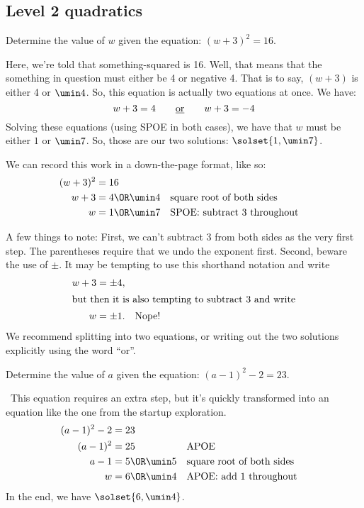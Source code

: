 \subsection{Level 2 quadratics}

\begin{boxexplore}
Determine the value of $w$ given the equation: $(w+3)^2 = 16$.
\end{boxexplore} %

Here, we're told that something-squared is 16. Well, that means that the something in question must either be 4 or negative 4. That is to say, $(w+3)$ is either 4 or $\umin4$. So, this equation is actually two equations at once. We have:
\[w+3 = 4 \qquad\text{\underline{or}}\qquad w+3 = -4\]
Solving these equations (using SPOE in both cases), we have that $w$ must be either $1$ or $\umin7$. So, those are our two solutions: $\solset{1,\umin7}$.

We can record this work in a down-the-page format, like so:
\begin{align*}
(w+3)^2 &= 16
\\
w+3 &= 4 \OR \umin4
&&\text{square root of both sides}
\\
w &= 1 \OR \umin7
&&\text{SPOE: subtract 3 throughout}
\end{align*}

A few things to note: First, we can't subtract 3 from both sides as the very first step. The parentheses require that we undo the exponent first. Second, beware the use of $\pm$. It may be tempting to use this shorthand notation and write
\begin{align*}
w+3 &= \pm4,\\
\intertext{but then it is also tempting to subtract 3 and write}
w &= \pm1. \quad\text{Nope!}
\end{align*}
We recommend splitting into two equations, or writing out the two solutions explicitly using the word ``or''.

\begin{boxex}
Determine the value of $a$ given the equation: $(a-1)^2 - 2 = 23$.

\exsoln\ This equation requires an extra step, but it's quickly transformed into an equation like the one from the startup exploration.
\begin{align*}
(a-1)^2 - 2 &= 23
\\
(a-1)^2 &= 25
&&\text{APOE}
\\
a-1 &= 5 \OR \umin5
&&\text{square root of both sides}
\\
w &= 6 \OR \umin4
&&\text{APOE: add 1 throughout}
\end{align*}
In the end, we have $\solset{6, \umin4}$.
\end{boxex}

